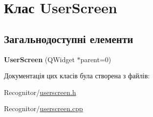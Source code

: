 \hypertarget{classUserScreen}{\section{Клас User\-Screen}
\label{classUserScreen}
}
\subsection*{Загальнодоступні елементи}
\begin{DoxyCompactItemize}
\item 
\hypertarget{classUserScreen_a27136456b8f1b4d10dfe1cbfc9c43d7c}{{\bfseries User\-Screen} (Q\-Widget $\ast$parent=0)}\label{classUserScreen_a27136456b8f1b4d10dfe1cbfc9c43d7c}

\end{DoxyCompactItemize}


Документація цих класів була створена з файлів\-:\begin{DoxyCompactItemize}
\item 
Recognitor/\hyperlink{userscreen_8h}{userscreen.\-h}\item 
Recognitor/\hyperlink{userscreen_8cpp}{userscreen.\-cpp}\end{DoxyCompactItemize}
